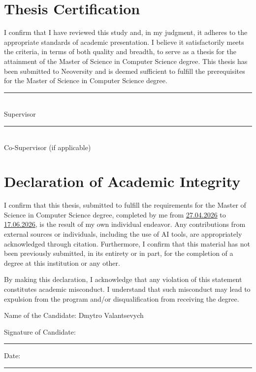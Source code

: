 \chapter*{Thesis Certification}
I confirm that I have reviewed this study and, in my judgment, it adheres to the appropriate standards of academic presentation. I believe it satisfactorily meets the criteria, in terms of both quality and breadth, to serve as a thesis for the attainment of the Master of Science in Computer Science degree. This thesis has been submitted to Neoversity and is deemed sufficient to fulfill the prerequisites for the Master of Science in Computer Science degree.

\vspace{2cm}
\noindent\rule{7cm}{0.4pt}\\
Supervisor

\vspace{1.5cm}
\noindent\rule{7cm}{0.4pt}\\
Co-Supervisor (if applicable)

\chapter*{Declaration of Academic Integrity}
I confirm that this thesis, submitted to fulfill the requirements for the Master of Science in Computer Science degree, completed by me from \underline{27.04.2026} to \underline{17.06.2026}, is the result of my own individual endeavor. Any contributions from external sources or individuals, including the use of AI tools, are appropriately acknowledged through citation. Furthermore, I confirm that this material has not been previously submitted, in its entirety or in part, for the completion of a degree at this institution or any other.

By making this declaration, I acknowledge that any violation of this statement constitutes academic misconduct. I understand that such misconduct may lead to expulsion from the program and/or disqualification from receiving the degree.

\vspace{0.8cm}
\noindent Name of the Candidate: Dmytro Valantsevych

\vspace{1.2cm}
\noindent Signature of Candidate: \rule{6cm}{0.4pt}\hfill Date: \rule{3.5cm}{0.4pt}


